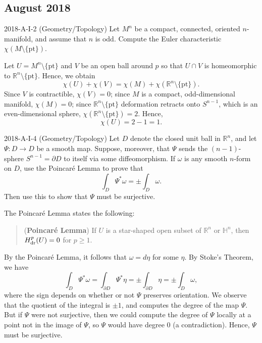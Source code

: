 \documentclass{article}
\begin{document}
\subsection{August 2018}
\begin{prb}{2018-A-I-2 (Geometry/Topology)}
	Let $M^{n}$ be a compact, connected, oriented $n$-manifold, and assume that $n$ is odd. Compute the Euler characteristic $\chi(M\setminus \{\text{pt}\})$. 
\end{prb}
\begin{solutions}
	Let $U = M^{n}\setminus \{\text{pt}\}$ and $V$ be an open ball around $p$ so that $U \cap V$ is homeomorphic to $\mathbb{R}^{n}\setminus \{\text{pt}\}$. Hence, we obtain 
	\begin{equation}
		\chi(U) + \chi(V) = \chi(M) + \chi(\mathbb{R}^{n}\setminus \{\text{pt}\}). 
	\end{equation}
	Since $V$ is contractible, $\chi(V) = 0$; since $M$ is a compact, odd-dimensional manifold, $\chi(M) = 0$; since $\mathbb{R}^{n}\setminus \{\text{pt}\}$ deformation retracts onto $S^{n - 1}$, which is an even-dimensional sphere, $\chi(\mathbb{R}^{n}\setminus \{\text{pt}\}) = 2$. Hence, 
	\begin{equation}
		\chi(U) = 2 - 1= 1. 
	\end{equation}
\end{solutions}
\begin{prb}{2018-A-I-4 (Geometry/Topology)}
	Let $D$ denote the closed unit ball in $\mathbb{R}^{n}$, and let $\Psi: D \to D$ be a smooth map. Suppose, moreover, that $\Psi$ sends the $(n - 1)$-sphere $S^{n - 1} = \partial D$ to itself via some diffeomorphism. If $\omega$ is any smooth $n$-form on $D$, use the Poincar{\'e} Lemma to prove that 
		\begin{equation*}
			\int_{D}\Psi^{\ast}\omega = \pm \int_{D}\omega. 
		\end{equation*}
	Then use this to show that $\Psi$ must be surjective. 
\end{prb}
\begin{solutions}
	The Poincar{\'e} Lemma states the following: 
		\begin{quote}
			(\textbf{Poincar{\'e} Lemma}) If $U$ is a star-shaped open subset of $\mathbb{R}^{n}$ or $\mathbb{H}^{n}$, then $H^{p}_{\text{dr}}(U) = 0$ for $p\geq 1$. 
		\end{quote}
	By the Poincar{\'e} Lemma, it follows that $\omega = d\eta$ for some $\eta$. By Stoke's Theorem, we have 
		\begin{equation}
			\int_{D}\Psi^{\ast}\omega = \int_{\partial D}\Psi^{\ast}\eta = \pm \int_{\partial D}\eta =\pm \int_{D}\omega, 
		\end{equation}
	where the sign depends on whether or not $\Psi$ preserves orientation. We observe that the quotient of the integral is $\pm 1$, and computes the degree of the map $\Psi$. But if $\Psi$ were not surjective, then we could compute the degree of $\Psi$ locally at a point not in the image of $\Psi$, so $\Psi$ would have degree 0 (a contradiction). Hence, $\Psi$ must be surjective. 
\end{solutions}
\end{document}
